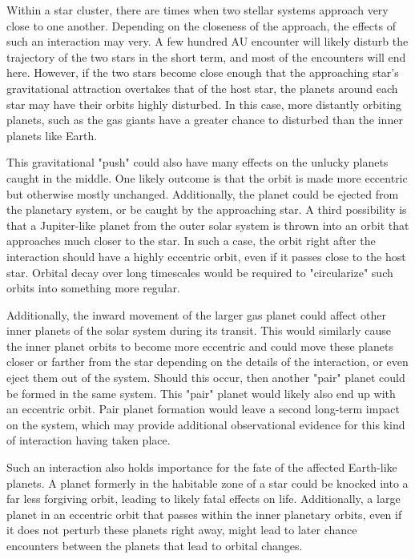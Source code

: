 \documentclass[12pt]{article}
\begin{document}
Within a star cluster, there are times when two stellar systems approach very close
to one another. Depending on the closeness of the approach, the effects of such
an interaction may very. A few hundred AU encounter will likely disturb the trajectory
of the two stars in the short term, and most of the encounters will end here. However,
if the two stars become close enough that the approaching star's gravitational attraction
overtakes that of the host star, the planets around each star may have their orbits
highly disturbed. In this case, more distantly orbiting planets, such as the gas giants
have a greater chance to disturbed than the inner planets like Earth.

This gravitational "push" could also have many effects on the unlucky planets caught in the
middle. One likely outcome is that the orbit is made more eccentric but otherwise
mostly unchanged. Additionally, the planet could be ejected from the planetary system,
or be caught by the approaching star. A third possibility is that a Jupiter-like planet
from the outer solar system is thrown into an orbit that approaches much closer to the
star. In such a case, the orbit right after the interaction should have a highly
eccentric orbit, even if it passes close to the host star. Orbital decay over long
timescales would be required to "circularize" such orbits into something more regular.

Additionally, the inward movement of the larger gas planet could affect other
inner planets of the solar system during its transit. This would similarly 
cause the inner planet orbits to become more eccentric and could move
these planets closer or farther from the star depending on the details of the
interaction, or even eject them out of the system. Should this occur,
then another "pair" planet could be formed in the same system. This "pair" planet 
would likely also end up with an eccentric orbit. Pair planet formation would leave
a second long-term impact on the system, which may provide additional observational
evidence for this kind of interaction having taken place.

Such an interaction also holds importance for the fate of the affected Earth-like planets.
A planet formerly in the habitable zone of a star could be knocked into a far less
forgiving orbit, leading to likely fatal effects on life. Additionally, a
large planet in an eccentric orbit that passes within the inner planetary orbits,
even if it does not perturb these planets right away, might lead to later chance
encounters between the planets that lead to orbital changes.
\end{document}
